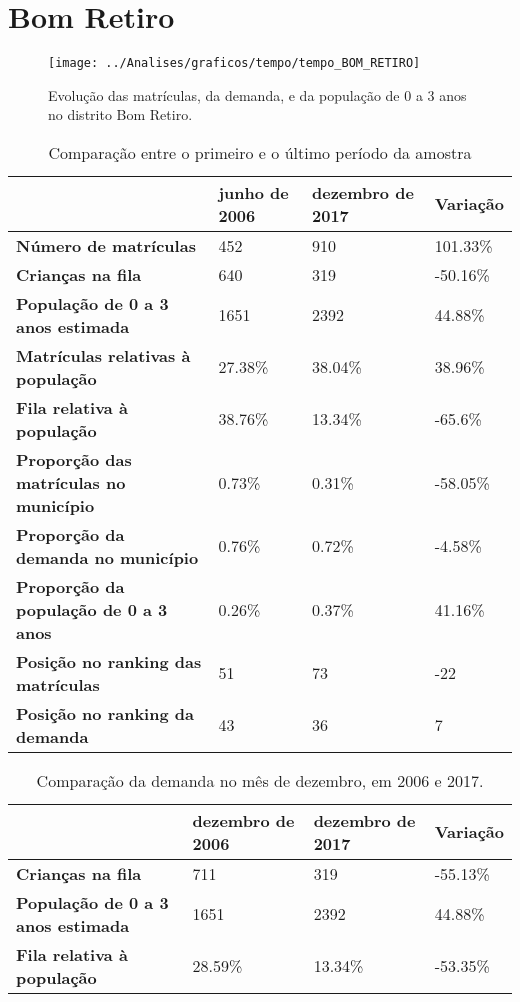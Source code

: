 \section{Bom Retiro}
\begin{figure}[H]
\centering
\texttt{[image: ../Analises/graficos/tempo/tempo\_BOM\_RETIRO]}
\caption{Evolução das matrículas, da demanda, e da população de 0 a 3 anos no distrito Bom Retiro.}
\end{figure}
\begin{table}[H]
\begin{tabular}{|l|l|l|l|}
\hline
\textbf{}                                      & \textbf{junho de 2006}       & \textbf{dezembro de 2017}    & \textbf{Variação} \\ \hline
\textbf{Número de matrículas}                  & 452 & 910 & 101.33\% \\ \hline
\textbf{Crianças na fila}                      & 640 & 319 & -50.16\% \\ \hline
\textbf{População de 0 a 3 anos estimada}      & 1651 & 2392 & 44.88\% \\ \hline
\textbf{Matrículas relativas à população}      & 27.38\% & 38.04\% & 38.96\% \\ \hline
\textbf{Fila relativa à população}             & 38.76\% & 13.34\% & -65.6\% \\ \hline
\textbf{Proporção das matrículas no município} & 0.73\% & 0.31\% & -58.05\% \\ \hline
\textbf{Proporção da demanda no município}     & 0.76\% & 0.72\% & -4.58\% \\ \hline
\textbf{Proporção da população de 0 a 3 anos}  & 0.26\% & 0.37\% & 41.16\% \\ \hline
\textbf{Posição no ranking das matrículas}     & 51 & 73 & -22 \\ \hline
\textbf{Posição no ranking da demanda}         & 43 & 36 & 7 \\ \hline
\end{tabular}
\caption{Comparação entre o primeiro e o último período da amostra}
\end{table}
\begin{table}[H]
\begin{tabular}{|l|l|l|l|}
\hline
\textbf{}                                 & \textbf{dezembro de 2006} & \textbf{dezembro de 2017} & \textbf{Variação} \\ \hline
\textbf{Crianças na fila}                      & 711 & 319 & -55.13\% \\ \hline
\textbf{População de 0 a 3 anos estimada}      & 1651 & 2392 & 44.88\% \\ \hline
\textbf{Fila relativa à população}             & 28.59\% & 13.34\% & -53.35\% \\ \hline
\end{tabular}
\caption{Comparação da demanda no mês de dezembro, em 2006 e 2017.}
\end{table}
